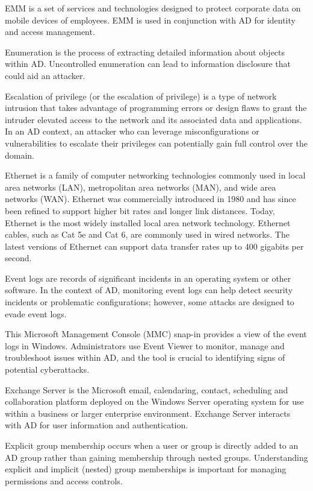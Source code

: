  EMM is a set of services and technologies designed to protect corporate data on mobile devices of employees. EMM is used in conjunction with AD for identity and access management.

 Enumeration is the process of extracting detailed information about objects within AD. Uncontrolled enumeration can lead to information disclosure that could aid an attacker.

 Escalation of privilege (or the escalation of privilege) is a type of network intrusion that takes advantage of programming errors or design flaws to grant the intruder elevated access to the network and its associated data and applications. In an AD context, an attacker who can leverage misconfigurations or vulnerabilities to escalate their privileges can potentially gain full control over the domain.

 Ethernet is a family of computer networking technologies commonly used in local area networks (LAN), metropolitan area networks (MAN), and wide area networks (WAN). Ethernet was commercially introduced in 1980 and has since been refined to support higher bit rates and longer link distances. Today, Ethernet is the most widely installed local area network technology. Ethernet cables, such as Cat 5e and Cat 6, are commonly used in wired networks. The latest versions of Ethernet can support data transfer rates up to 400 gigabits per second.

 Event logs are records of significant incidents in an operating system or other software. In the context of AD, monitoring event logs can help detect security incidents or problematic configurations; however, some attacks are designed to evade event logs.

 This Microsoft Management Console (MMC) snap-in provides a view of the event logs in Windows. Administrators use Event Viewer to monitor, manage and troubleshoot issues within AD, and the tool is crucial to identifying signs of potential cyberattacks.

 Exchange Server is the Microsoft email, calendaring, contact, scheduling and collaboration platform deployed on the Windows Server operating system for use within a business or larger enterprise environment. Exchange Server interacts with AD for user information and authentication.

 Explicit group membership occurs when a user or group is directly added to an AD group rather than gaining membership through nested groups. Understanding explicit and implicit (nested) group memberships is important for managing permissions and access controls.

